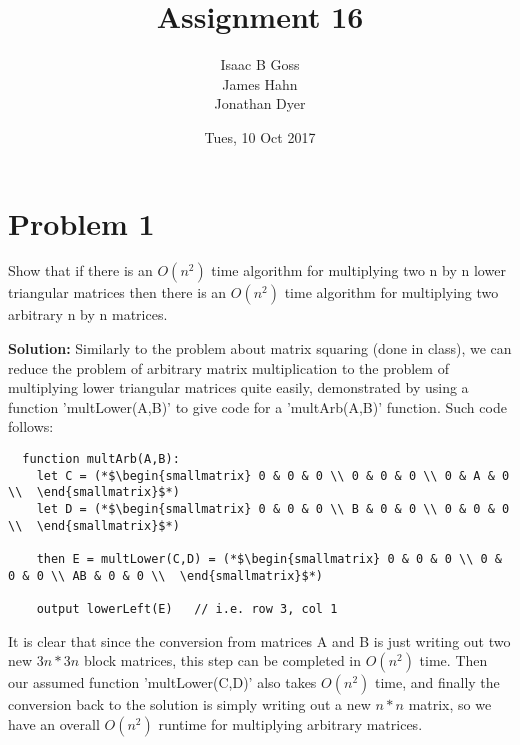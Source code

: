 \documentclass{article}
\author{Isaac B Goss\\ James Hahn\\ Jonathan Dyer}
\title{Assignment 16}
\date{Tues, 10 Oct 2017}
\providecommand{\prob}[1]{\section*{Problem #1}}
\providecommand{\soln}{\textbf{Solution: }}
\begin{document}
\maketitle





\prob{1}
Show that if there is an $O\left(n^2\right)$ time algorithm for multiplying two n by n lower triangular matrices then there is an $O\left(n^2\right)$ time algorithm for multiplying two arbitrary n by n matrices.

\soln Similarly to the problem about matrix squaring (done in class), we can reduce the problem of arbitrary matrix multiplication to the problem of multiplying lower triangular matrices quite easily, demonstrated by using a function 'multLower(A,B)' to give code for a 'multArb(A,B)' function. Such code follows:

\begin{lstlisting}
  function multArb(A,B):
    let C = (*$\begin{smallmatrix} 0 & 0 & 0 \\ 0 & 0 & 0 \\ 0 & A & 0 \\  \end{smallmatrix}$*)
    let D = (*$\begin{smallmatrix} 0 & 0 & 0 \\ B & 0 & 0 \\ 0 & 0 & 0 \\  \end{smallmatrix}$*)

    then E = multLower(C,D) = (*$\begin{smallmatrix} 0 & 0 & 0 \\ 0 & 0 & 0 \\ AB & 0 & 0 \\  \end{smallmatrix}$*)

    output lowerLeft(E)   // i.e. row 3, col 1
\end{lstlisting}

It is clear that since the conversion from matrices A and B is just writing out two new $3n * 3n$ block matrices, this step can be completed in $O\left(n^2\right)$ time. Then our assumed function 'multLower(C,D)' also takes $O\left(n^2\right)$ time, and finally the conversion back to the solution is simply writing out a new $n * n$ matrix, so we have an overall $O\left(n^2\right)$ runtime for multiplying arbitrary matrices.
\end{document}
